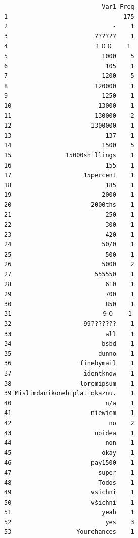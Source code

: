 \documentclass[]{article}
\begin{document}
\begin{verbatim}
                           Var1 Freq
1                                175
2                             -    1
3                        ??????    1
4                        １００    1
5                          1000    5
6                           105    1
7                          1200    5
8                        120000    1
9                          1250    1
10                        13000    1
11                       130000    2
12                      1300000    1
13                          137    1
14                         1500    5
15               15000shillings    1
16                          155    1
17                    15percent    1
18                          185    1
19                         2000    1
20                      2000ths    1
21                          250    1
22                          300    1
23                          420    1
24                         50/0    1
25                          500    1
26                         5000    2
27                       555550    1
28                          610    1
29                          700    1
30                          850    1
31                         ９０    1
32                    99???????    1
33                          all    1
34                         bsbd    1
35                        dunno    1
36                   finebymail    1
37                    idontknow    1
38                   loremipsum    1
39 Mislimdanikonebiplatiokaznu.    1
40                          n/a    1
41                      niewiem    1
42                           no    2
43                       noidea    1
44                          non    1
45                         okay    1
46                      pay1500    1
47                        super    1
48                        Todos    1
49                      vsichni    1
50                      všichni    1
51                         yeah    1
52                          yes    3
53                  Yourchances    1
\end{verbatim}
\end{document}
